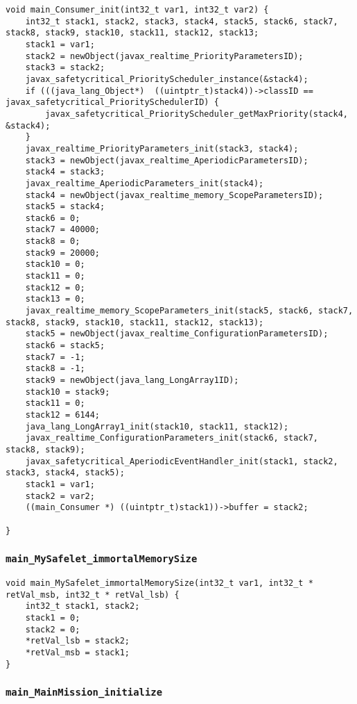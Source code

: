 \begin{landscape}
\begin{multicols}{2}
\begin{lstlisting}[firstnumber=2426]
void main_Consumer_init(int32_t var1, int32_t var2) {
	int32_t stack1, stack2, stack3, stack4, stack5, stack6, stack7, stack8, stack9, stack10, stack11, stack12, stack13;
	stack1 = var1;
	stack2 = newObject(javax_realtime_PriorityParametersID);
	stack3 = stack2;
	javax_safetycritical_PriorityScheduler_instance(&stack4);
	if (((java_lang_Object*)  ((uintptr_t)stack4))->classID == javax_safetycritical_PrioritySchedulerID) {
		javax_safetycritical_PriorityScheduler_getMaxPriority(stack4, &stack4);
	}
	javax_realtime_PriorityParameters_init(stack3, stack4);
	stack3 = newObject(javax_realtime_AperiodicParametersID);
	stack4 = stack3;
	javax_realtime_AperiodicParameters_init(stack4);
	stack4 = newObject(javax_realtime_memory_ScopeParametersID);
	stack5 = stack4;
	stack6 = 0;
	stack7 = 40000;
	stack8 = 0;
	stack9 = 20000;
	stack10 = 0;
	stack11 = 0;
	stack12 = 0;
	stack13 = 0;
	javax_realtime_memory_ScopeParameters_init(stack5, stack6, stack7, stack8, stack9, stack10, stack11, stack12, stack13);
	stack5 = newObject(javax_realtime_ConfigurationParametersID);
	stack6 = stack5;
	stack7 = -1;
	stack8 = -1;
	stack9 = newObject(java_lang_LongArray1ID);
	stack10 = stack9;
	stack11 = 0;
	stack12 = 6144;
	java_lang_LongArray1_init(stack10, stack11, stack12);
	javax_realtime_ConfigurationParameters_init(stack6, stack7, stack8, stack9);
	javax_safetycritical_AperiodicEventHandler_init(stack1, stack2, stack3, stack4, stack5);
	stack1 = var1;
	stack2 = var2;
	((main_Consumer *) ((uintptr_t)stack1))->buffer = stack2;

}
\end{lstlisting}

\subsubsection{\texttt{main\_MySafelet\_immortalMemorySize}}

\begin{lstlisting}[firstnumber=2477]
void main_MySafelet_immortalMemorySize(int32_t var1, int32_t * retVal_msb, int32_t * retVal_lsb) {
	int32_t stack1, stack2;
	stack1 = 0;
	stack2 = 0;
	*retVal_lsb = stack2;
	*retVal_msb = stack1;
}
\end{lstlisting}

\subsubsection{\texttt{main\_MainMission\_initialize}}


\end{multicols}
\end{landscape}

